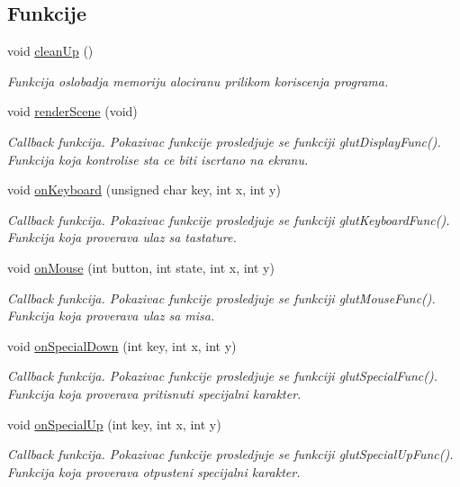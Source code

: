 \subsection*{Funkcije}
\begin{DoxyCompactItemize}
\item 
void \hyperlink{namespacecore_aa39dd0a5d67c7531b2adf84acb6bb496}{clean\+Up} ()
\begin{DoxyCompactList}\small\item\em Funkcija oslobadja memoriju alociranu prilikom koriscenja programa. \end{DoxyCompactList}\item 
void \hyperlink{namespacecore_a1c3be366234e051e17b4b45f40c18960}{render\+Scene} (void)
\begin{DoxyCompactList}\small\item\em Callback funkcija. Pokazivac funkcije prosledjuje se funkciji glut\+Display\+Func(). Funkcija koja kontrolise sta ce biti iscrtano na ekranu. \end{DoxyCompactList}\item 
void \hyperlink{namespacecore_a179fad39a2b3f74cf7a0bffb578fce00}{on\+Keyboard} (unsigned char key, int x, int y)
\begin{DoxyCompactList}\small\item\em Callback funkcija. Pokazivac funkcije prosledjuje se funkciji glut\+Keyboard\+Func(). Funkcija koja proverava ulaz sa tastature. \end{DoxyCompactList}\item 
void \hyperlink{namespacecore_a581fd18fb14102b9234a113bc95341b4}{on\+Mouse} (int button, int state, int x, int y)
\begin{DoxyCompactList}\small\item\em Callback funkcija. Pokazivac funkcije prosledjuje se funkciji glut\+Mouse\+Func(). Funkcija koja proverava ulaz sa misa. \end{DoxyCompactList}\item 
void \hyperlink{namespacecore_a3ad12cad5f74289de4ad97762e453621}{on\+Special\+Down} (int key, int x, int y)
\begin{DoxyCompactList}\small\item\em Callback funkcija. Pokazivac funkcije prosledjuje se funkciji glut\+Special\+Func(). Funkcija koja proverava pritisnuti specijalni karakter. \end{DoxyCompactList}\item 
void \hyperlink{namespacecore_a590273d60aac2764ebf098f1b9aab3fe}{on\+Special\+Up} (int key, int x, int y)
\begin{DoxyCompactList}\small\item\em Callback funkcija. Pokazivac funkcije prosledjuje se funkciji glut\+Special\+Up\+Func(). Funkcija koja proverava otpusteni specijalni karakter. \end{DoxyCompactList}\end{DoxyCompactItemize}
